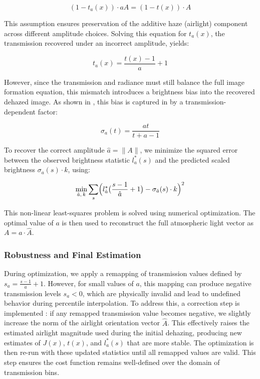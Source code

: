 \documentclass[conference]{IEEEtran}
\begin{document}
\begin{equation}
\label{matching_airlight}
(1 - t_a(x)) \cdot aA = (1 - t(x)) \cdot A
\end{equation}

This assumption ensures preservation of the additive haze (airlight) component across different amplitude choices. Solving this equation for \( t_a(x) \), the transmission recovered under an incorrect amplitude, yields:

\begin{equation}
\label{recovered_transmission }
t_a(x) = \frac{t(x) - 1}{a} + 1
\end{equation}

However, since the transmission and radiance must still balance the full image formation equation, this mismatch introduces a brightness bias into the recovered dehazed image. As shown in \cite{airlight}, this bias is captured in by a transmission-dependent factor:

\begin{equation}
\label{brightness_bias}
\sigma_a(t) = \frac{a t}{t + a - 1}
\end{equation}

To recover the correct amplitude \( \hat{a} = \|A\| \), we minimize the squared error between the observed brightness statistic \( l^*_a(s) \) and the predicted scaled brightness \( \sigma_a(s) \cdot k \), using:

\begin{equation}
    \label{optimisation}
    \min_{\hat{a},\, k} \sum_s \Bigl( l^*_{\hat{a}}\bigl( \frac{s - 1}{\hat{a}} + 1 \bigr) - \sigma_{\hat{a}}(s) \cdot k \Bigr)^2
\end{equation}

This non-linear least-squares problem is solved using numerical optimization. The optimal value of \( a \) is then used to reconstruct the full atmospheric light vector as \( A = a \cdot \hat{A} \).


\subsubsection{Robustness and Final Estimation}


During optimization, we apply a remapping of transmission values defined by \( s_a = \frac{s - 1}{a} + 1 \). However, for small values of \( a \), this mapping can produce negative transmission levels \( s_a < 0 \), which are physically invalid and lead to undefined behavior during percentile interpolation. To address this, a correction step is implemented \cite{airlight}: if any remapped transmission value becomes negative, we slightly increase the norm of the airlight orientation vector \( \hat{A} \). This effectively raises the estimated airlight magnitude used during the initial dehazing, producing new estimates of \( J(x) \), \( t(x) \), and \( l^*_a(s) \) that are more stable. The optimization is then re-run with these updated statistics until all remapped values are valid. This step ensures the cost function remains well-defined over the domain of transmission bins.
\end{document}
